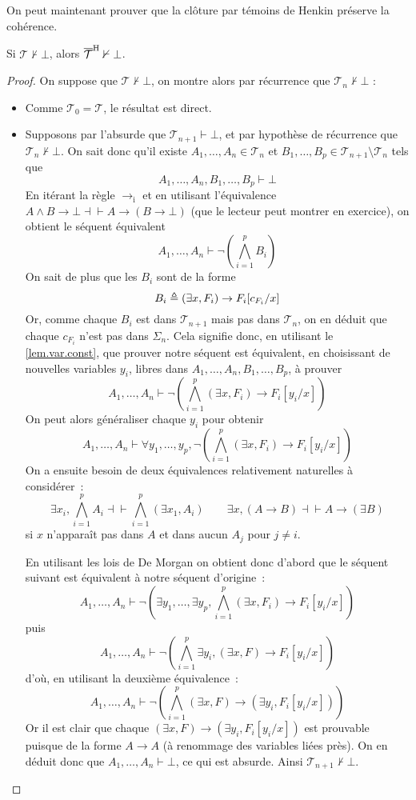 On peut maintenant prouver que la clôture par témoins de Henkin préserve la
cohérence.

\begin{property}
  Si $\mathcal T\nvdash \bot$, alors $\overline{\mathcal T}^{\mathrm H}\nvdash\bot$.
\end{property}

\begin{proof}
  On suppose que $\mathcal T\nvdash\bot$, on montre alors par récurrence que
  $\mathcal T_n\nvdash\bot$ :
  \begin{itemize}
  \item Comme $\mathcal T_0 =\mathcal T$, le résultat est direct.
  \item Supposons par l'absurde que $\mathcal T_{n+1}\vdash \bot$, et par
    hypothèse de récurrence que $\mathcal T_n\nvdash \bot$. On sait donc qu'il
    existe $A_1,\ldots,A_n \in \mathcal T_n$ et
    $B_1,\ldots,B_p \in \mathcal T_{n+1}\setminus \mathcal T_n$
    tels que
    \[A_1,\ldots,A_n,B_1,\ldots,B_p\vdash \bot\]
    En itérant la règle $\to_\mathrm i$ et en utilisant l'équivalence
    $A\land B \to \bot \dashv\vdash A \to (B \to \bot)$ (que le lecteur peut
    montrer en exercice), on obtient le séquent équivalent
    \[A_1,\ldots,A_n\vdash \lnot\left(\bigwedge_{i = 1}^p B_i\right)\]
    On sait de plus que les $B_i$ sont de la forme
    \[B_i \triangleq (\exists x, F_i) \to F_i[c_{F_i}/x]\]
    Or, comme chaque $B_i$ est dans $\mathcal T_{n+1}$ mais pas dans
    $\mathcal T_n$, on en déduit que chaque $c_{F_i}$ n'est pas dans $\Sigma_n$.
    Cela signifie donc, en utilisant le \cref{lem.var.const}, que prouver notre
    séquent est équivalent, en choisissant de nouvelles variables $y_i$, libres
    dans $A_1,\ldots,A_n,B_1,\ldots,B_p$, à prouver
    \[A_1,\ldots,A_n\vdash \lnot \left(\bigwedge_{i = 1}^p
    (\exists x, F_i) \to F_i[y_i/x]\right)\]
    On peut alors généraliser chaque $y_i$ pour obtenir
    \[A_1,\ldots,A_n\vdash \forall y_1,\ldots,y_p, \lnot \left(
    \bigwedge_{i=1}^p(\exists x, F_i) \to F_i[y_i/x]\right)\]
    On a ensuite besoin de deux équivalences relativement naturelles à
    considérer~:
    \[\exists x_i, \bigwedge_{i = 1}^p A_i\dashv\vdash
    \bigwedge_{i = 1}^p(\exists x_1, A_i)\qquad
    \exists x, (A \to B) \dashv\vdash A \to (\exists B)\]
    si $x$ n'apparaît pas dans $A$ et dans aucun $A_j$ pour $j \neq i$.

    En utilisant les lois de De Morgan on obtient donc d'abord que le séquent
    suivant est équivalent à notre séquent d'origine~:
    \[A_1,\ldots,A_n\vdash \lnot\left(\exists y_1,\ldots,\exists y_p,
    \bigwedge_{i = 1}^p (\exists x, F_i) \to F_i[y_i/x]\right)\]
    puis 
    \[A_1,\ldots,A_n\vdash \lnot\left(\bigwedge_{i = 1}^p
    \exists y_i,(\exists x, F) \to F_i[y_i/x]\right)\]
    d'où, en utilisant la deuxième équivalence~:
    \[A_1,\ldots,A_n\vdash \lnot\left(\bigwedge_{i = 1}^p
    (\exists x, F) \to (\exists y_i, F_i[y_i/x])\right)\]
    Or il est clair que chaque $(\exists x, F)\to (\exists y_i, F_i[y_i/x])$
    est prouvable puisque de la forme $A \to A$ (à renommage des variables liées
    près). On en déduit donc que $A_1,\ldots,A_n\vdash \bot$, ce qui est
    absurde. Ainsi $\mathcal T_{n+1}\nvdash \bot$.
  \end{itemize}


\end{proof}
